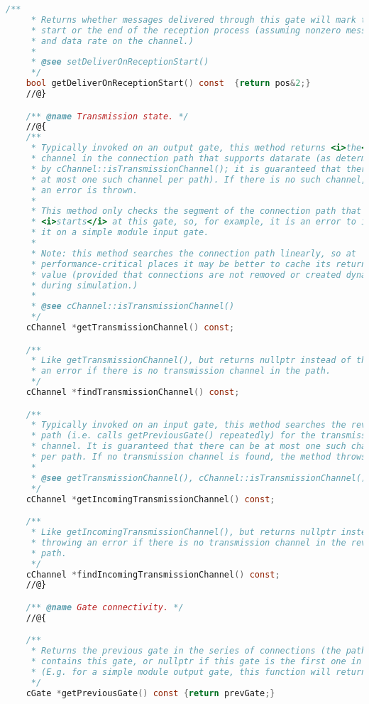 \begin{lstlisting}[language=c]
    /**
     * Returns whether messages delivered through this gate will mark the
     * start or the end of the reception process (assuming nonzero message length
     * and data rate on the channel.)
     *
     * @see setDeliverOnReceptionStart()
     */
    bool getDeliverOnReceptionStart() const  {return pos&2;}
    //@}

    /** @name Transmission state. */
    //@{
    /**
     * Typically invoked on an output gate, this method returns <i>the</i>
     * channel in the connection path that supports datarate (as determined
     * by cChannel::isTransmissionChannel(); it is guaranteed that there can be
     * at most one such channel per path). If there is no such channel,
     * an error is thrown.
     *
     * This method only checks the segment of the connection path that
     * <i>starts</i> at this gate, so, for example, it is an error to invoke
     * it on a simple module input gate.
     *
     * Note: this method searches the connection path linearly, so at
     * performance-critical places it may be better to cache its return
     * value (provided that connections are not removed or created dynamically
     * during simulation.)
     *
     * @see cChannel::isTransmissionChannel()
     */
    cChannel *getTransmissionChannel() const;

    /**
     * Like getTransmissionChannel(), but returns nullptr instead of throwing
     * an error if there is no transmission channel in the path.
     */
    cChannel *findTransmissionChannel() const;

    /**
     * Typically invoked on an input gate, this method searches the reverse
     * path (i.e. calls getPreviousGate() repeatedly) for the transmission
     * channel. It is guaranteed that there can be at most one such channel
     * per path. If no transmission channel is found, the method throws an error.
     *
     * @see getTransmissionChannel(), cChannel::isTransmissionChannel()
     */
    cChannel *getIncomingTransmissionChannel() const;

    /**
     * Like getIncomingTransmissionChannel(), but returns nullptr instead of
     * throwing an error if there is no transmission channel in the reverse
     * path.
     */
    cChannel *findIncomingTransmissionChannel() const;
    //@}

    /** @name Gate connectivity. */
    //@{

    /**
     * Returns the previous gate in the series of connections (the path) that
     * contains this gate, or nullptr if this gate is the first one in the path.
     * (E.g. for a simple module output gate, this function will return nullptr.)
     */
    cGate *getPreviousGate() const {return prevGate;}


\end{lstlisting}
